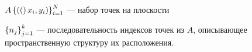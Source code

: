 






 $A \left\{\left((\right)x_i, y_i)\right\}_{i=1}^N$ --- набор точек на плоскости

 $\left\{n_j\right\}_{j=1}^k$ --- последовательность индексов точек из $A$, описывающее пространственную структуру их расположения.



